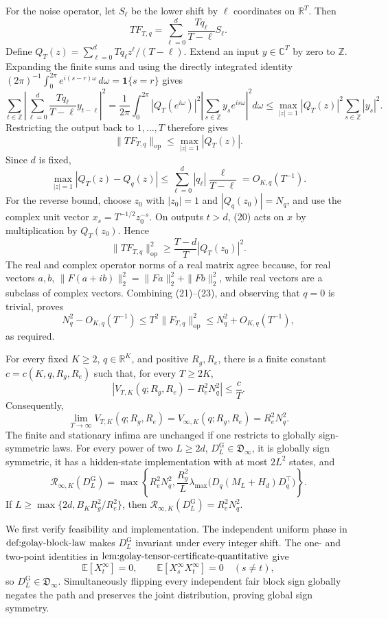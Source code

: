 For the noise operator, let \(S_\ell\) be the lower shift by \(\ell\) coordinates on \(\mathbb R^T\).  Then
\[
TF_{T,q}=\sum_{\ell=0}^d\frac{Tq_\ell}{T-\ell}S_\ell. \tag{20}
\]
Define \(Q_T(z)=\sum_{\ell=0}^dTq_\ell z^\ell/(T-\ell)\).  Extend an input \(y\in\mathbb C^T\) by zero to \(\mathbb Z\).  Expanding the finite sums and using the directly integrated identity \((2\pi)^{-1}\int_0^{2\pi}e^{i(s-r)\omega}\,d\omega=\mathbf1\{s=r\}\) gives
\[
\sum_{t\in\mathbb Z}\left|\sum_{\ell=0}^d\frac{Tq_\ell}{T-\ell}y_{t-\ell}\right|^2
=\frac1{2\pi}\int_0^{2\pi}|Q_T(e^{i\omega})|^2
 \left|\sum_{s\in\mathbb Z}y_se^{is\omega}\right|^2d\omega
\le \max_{|z|=1}|Q_T(z)|^2\sum_{s\in\mathbb Z}|y_s|^2.
\]
Restricting the output back to \(1,\ldots,T\) therefore gives
\[
\|TF_{T,q}\|_{\mathrm{op}}\le\max_{|z|=1}|Q_T(z)|. \tag{21}
\]
Since \(d\) is fixed,
\[
\max_{|z|=1}|Q_T(z)-Q_q(z)|
\le\sum_{\ell=0}^d|q_\ell|\frac{\ell}{T-\ell}=O_{K,q}(T^{-1}). \tag{22}
\]
For the reverse bound, choose \(z_0\) with \(|z_0|=1\) and \(|Q_q(z_0)|=N_q\), and use the complex unit vector \(x_s=T^{-1/2}z_0^{-s}\).  On outputs \(t>d\), (20) acts on \(x\) by multiplication by \(Q_T(z_0)\).  Hence
\[
\|TF_{T,q}\|_{\mathrm{op}}^2
\ge\frac{T-d}{T}|Q_T(z_0)|^2. \tag{23}
\]
The real and complex operator norms of a real matrix agree because, for real vectors \(a,b\), \(\|F(a+ib)\|_2^2=\|Fa\|_2^2+\|Fb\|_2^2\), while real vectors are a subclass of complex vectors.  Combining (21)--(23), and observing that \(q=0\) is trivial, proves
\[
N_q^2-O_{K,q}(T^{-1})
\le T^2\|F_{T,q}\|_{\mathrm{op}}^2
\le N_q^2+O_{K,q}(T^{-1}), \tag{24}
\]
as required.

For every fixed \(K\ge2\), \(q\in\mathbb R^K\), and positive \(R_g,R_e\), there is a finite constant \(c=c(K,q,R_g,R_e)\) such that, for every \(T\ge2K\),
\[
\left|V_{T,K}(q;R_g,R_e)-R_e^2N_q^2\right|\le\frac{c}{T}.
\]
Consequently,
\[
\lim_{T\to\infty}V_{T,K}(q;R_g,R_e)
=V_{\infty,K}(q;R_g,R_e)=R_e^2N_q^2.
\]
The finite and stationary infima are unchanged if one restricts to globally sign-symmetric laws.  For every power of two \(L\ge2d\), \(D_L^{\mathrm G}\in\mathfrak D_{\infty}\), it is globally sign symmetric, it has a hidden-state implementation with at most \(2L^2\) states, and
\[
\mathcal R_{\infty,K}(D_L^{\mathrm G})
=\max\!\left\{R_e^2N_q^2,
\frac{R_g^2}{L}\lambda_{\max}\!\bigl(D_q(M_L+H_d)D_q^{\top}\bigr)\right\}.
\]
If \(L\ge\max\{2d,B_KR_g^2/R_e^2\}\), then \(\mathcal R_{\infty,K}(D_L^{\mathrm G})=R_e^2N_q^2\).

We first verify feasibility and implementation.  The independent uniform phase in \(\textnormal{def:golay-block-law}\) makes \(D_L^{\mathrm G}\) invariant under every integer shift.  The one- and two-point identities in \(\textnormal{lem:golay-tensor-certificate-quantitative}\) give
\[
\mathbb E[X_t^{\infty}]=0,
\qquad \mathbb E[X_s^{\infty}X_t^{\infty}]=0\quad(s\ne t), \tag{25}
\]
so \(D_L^{\mathrm G}\in\mathfrak D_\infty\).  Simultaneously flipping every independent fair block sign globally negates the path and preserves the joint distribution, proving global sign symmetry.

